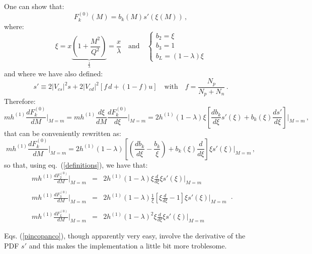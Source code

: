 \documentclass[10pt,a4paper]{article}
\begin{document}
One can show that:
\begin{equation}
F^{(0)}_k(M) = b_k(M)s'(\xi(M))\,,
\end{equation}
where:
\begin{equation}
\xi = x\underbrace{\left(1+\frac{M^2}{Q^2}\right)}_{\frac1\lambda}=\frac{x}\lambda\quad\mbox{and}\quad
\left\{\begin{array}{l}
b_2 = \xi\\
b_3 = 1\\
b_L = (1-\lambda)\xi
\end{array}
\right.
\label{definitions}
\end{equation}
and where we have also defined:
\begin{equation}
s'\equiv 2|V_{cs}|^2s+2|V_{cd}|^2[f\,d+(1-f)u]\quad\mbox{with}\quad f=\frac{N_p}{N_p+N_n}\,.
\end{equation}
Therefore:
\begin{equation}
mh^{(1)}\frac{dF^{(0)}_k}{dM}\bigg|_{M=m} =
mh^{(1)}\frac{d\xi}{dM}\frac{dF^{(0)}_k}{d\xi}\bigg|_{M=m} =
2h^{(1)}(1-\lambda)\xi\left[\frac{db_k}{d\xi}s'(\xi)+b_k(\xi)\frac{ds'}{d\xi}\right]\bigg|_{M=m}\,,
\label{pincopanco}
\end{equation}
that can be conveniently rewritten as:
\begin{equation}
mh^{(1)}\frac{dF^{(0)}_k}{dM}\bigg|_{M=m} = 2h^{(1)}(1-\lambda)\left[\left(\frac{db_k}{d\xi}-\frac{b_k}{\xi}\right)+b_k(\xi)\frac{d}{d\xi}\right]\xi s'(\xi)\bigg|_{M=m}\,,
\end{equation}
so that, using eq.~(\ref{definitions}), we have that:
\begin{equation}
\begin{array}{rcl}
\displaystyle mh^{(1)}\frac{dF^{(0)}_2}{dM}\bigg|_{M=m} &=& \displaystyle
2h^{(1)}(1-\lambda)\xi\frac{d}{d\xi} \xi s'(\xi)\bigg|_{M=m}\\
\\
\displaystyle mh^{(1)}\frac{dF^{(0)}_3}{dM}\bigg|_{M=m} &=& \displaystyle
2h^{(1)}(1-\lambda)\frac{1}{\xi}\left[ \xi\frac{d}{d\xi}-1\right]\xi
s'(\xi)\bigg|_{M=m}\\
\\
\displaystyle mh^{(1)}\frac{dF^{(0)}_L}{dM}\bigg|_{M=m} &=& \displaystyle
2h^{(1)}(1-\lambda)^2\xi \frac{d}{d\xi}\xi s'(\xi)\bigg|_{M=m}
\end{array}\,.
\end{equation}


Eqs. (\ref{pincopanco}), though apparently very easy, involve the derivative of the PDF $s'$ and this makes the implementation a little bit more troblesome.
\end{document}
